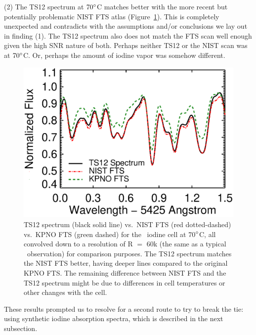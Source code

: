 (2) The TS12 spectrum at $70^{\circ}$C matches better with the more
recent but potentially problematic NIST FTS atlas
(Figure~\ref{het:fig:hetts12}). This is completely unexpected and
contradicts with the assumptions and/or conclusions we lay out in
finding (1). The TS12 spectrum also does not match the FTS scan well
enough given the high SNR nature of both. Perhaps neither TS12 or the
NIST scan was at $70^{\circ}$C. Or, perhaps the amount of iodine vapor
was somehow different. 


\begin{figure}
\centering
\includegraphics[scale=0.5]{het/het70_comp.eps}
\caption{TS12 spectrum (black solid line) vs.\ NIST FTS (red
  dotted-dashed) vs.\ KPNO FTS (green dashed) for the \het\ iodine
  cell at 70$^{\circ}$C, all convolved down to a resolution of R $=$
  60k (the same as a typical \het\ observation) for comparison
  purposes. The TS12 spectrum matches the NIST FTS better, having
  deeper lines compared to the original KPNO FTS. The remaining
  difference between NIST FTS and the TS12 spectrum might be due to
  differences in cell temperatures or other changes with the cell. 
\label{het:fig:hetts12}}
\end{figure}

These results prompted us to resolve for a second route to try to break
the tie: using synthetic iodine absorption spectra, which is described
in the next subsection.


